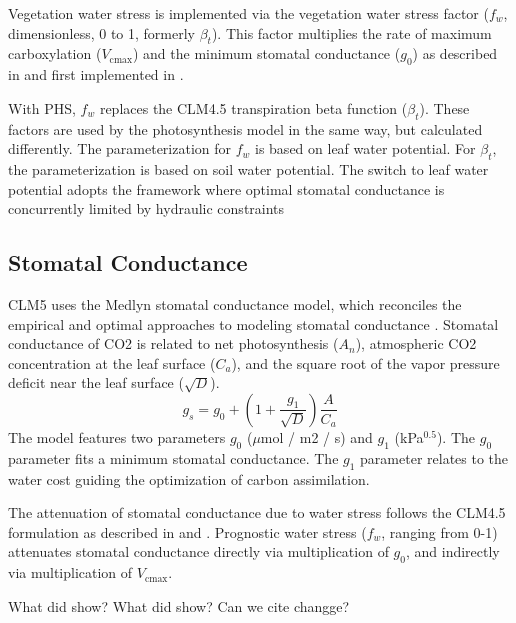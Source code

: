 \documentclass[draft,linenumbers]{agujournal}
\begin{document}
    Vegetation water stress is implemented via the vegetation water stress factor ($f_w$, dimensionless, 0 to 1, formerly 
    $\beta_t$). This factor multiplies the rate of maximum carboxylation ($V_{\text{cmax}}$) and the minimum stomatal 
    conductance ($g_0$) as described in \citet{oleson2013} and first implemented in \citet{sellers1996a,sellers1996b}. 
    
    With PHS, $f_w$ replaces the CLM4.5 transpiration beta function ($\beta_t$). 
    These factors are used by the photosynthesis model in the same way, but calculated differently. 
    The parameterization for $f_w$ is based on leaf water potential. 
    For $\beta_t$, the parameterization is based on soil water potential.
    The switch to leaf water potential adopts the framework where optimal stomatal conductance is concurrently limited by hydraulic constraints \citep{novick2016a}


\subsection{Stomatal Conductance}
\label{sect:gs}
    CLM5 uses the Medlyn stomatal conductance model, which reconciles the empirical and optimal approaches to modeling 
    stomatal conductance \citep{medlyn2011}. 
    Stomatal conductance of CO2 is related to net photosynthesis ($A_n$), atmospheric CO2 concentration at the leaf surface 
    ($C_a$), and the square root of the vapor pressure deficit near the leaf surface ($\sqrt{D}$).
    \begin{equation}
    g_s=g_0+\left(1+\dfrac{g_1}{\sqrt{D}}\right)\dfrac{A}{C_a}
    \end{equation}
    The model features two parameters $g_0$ ($\mu$mol / m2 / s) and $g_1$ (kPa$^{0.5}$). The $g_0$ parameter fits a 
    minimum stomatal conductance. The $g_1$ parameter relates to the water cost guiding the optimization of carbon 
    assimilation.
    
    The attenuation of stomatal conductance due to water stress follows the CLM4.5 formulation as described in 
    \citet{oleson2013} and \citet{bonan2011}. Prognostic water stress ($f_w$, ranging from 0-1) attenuates stomatal 
    conductance directly via multiplication of $g_0$, and indirectly via multiplication of $V_{\text{cmax}}$. 
    
    What did \citet{zhou2014} show? What did \citet{manzoni2011} show? Can we cite changge?
\end{document}
